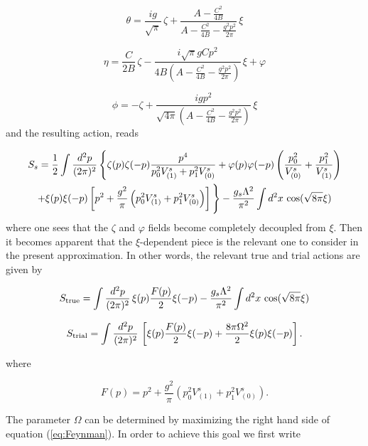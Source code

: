\documentclass[a4paper,a4paper]{article}
\begin{document}
\begin{equation}\label{eq:changeVariables}
\theta=\frac{ig}{\sqrt{\pi}}\,\zeta+\frac{A-\frac{C^2}{4B}}
{A-\frac{C^2}{4B}-\frac{g^2p^2}{2\pi}}\,\xi
\end{equation}

\begin{equation}
\eta=\frac{C}{2B}\,\zeta - \frac{i\sqrt{\pi}gCp^2}
{4B\left(A-\frac{C^2}{4B}-\frac{g^2p^2}{2\pi}\right)}\,\xi+\varphi
\end{equation}

\begin{equation}
\phi=-\zeta+\frac{igp^2}{\sqrt{4\pi}\left(A-\frac{C^2}{4B}-\frac{g^2p^2}{2\pi}\right)}\,\xi
\end{equation}
and the resulting action,  reads

\begin{multline}
S_s=\frac{1}{2}\int\frac{d^2p}{(2\pi)^2}\,\Bigg\{\zeta(p)\zeta(-p)\frac{p^4}{p_0^2 V^s_{(1)}+p_1^2 V^s_{(0)}}
+\varphi(p)\varphi(-p)\left(\frac{p_0^2}{V^s_{(0)}}+\frac{p_1^2}{V^s_{(1)}}\right)\\
+\xi(p)\xi(-p)\left[p^2+\frac{g^2}{\pi}\left(p_0^2 V^s_{(1)}+p_1^2 V^s_{(0)}\right)\right]\Bigg\}
-\frac{g_s\Lambda^2}{\pi^2}\int d^2x\,\cos(\sqrt{8\pi}\xi)
\end{multline}
where one sees that the $\zeta$ and $\varphi$ fields become completely decoupled from
$\xi$. Then it becomes apparent that the $\xi$-dependent piece is the relevant one to
consider in the present approximation. In other words, the relevant true and trial
actions are given by

\begin{equation}
S_{\text{true}}=\int\frac{d^2p}{(2\pi)^2}\,\xi(p)\frac{F(p)}{2}\xi(-p) - \frac{g_s\Lambda^2}{\pi^2}\int
d^2x\,\cos(\sqrt{8\pi}\xi)
\end{equation}

\begin{equation}
S_{\text{trial}}=\int\frac{d^2p}{(2\pi)^2}\,\left[\xi(p)\frac{F(p)}{2}\xi(-p) +
\frac{8\pi\Omega^2}{2}\xi(p)\xi(-p)\right].
\end{equation}

\noindent where

\begin{equation}
F(p)=p^2+\frac{g^2}{\pi}\left(p_0^2 V^s_{(1)}+p_1^2 V^s_{(0)}\right).
\end{equation}

The parameter $\Omega$ can be determined by maximizing the right hand side of equation
(\ref{eq:Feynman}). In order to achieve this goal we first write
\end{document}
